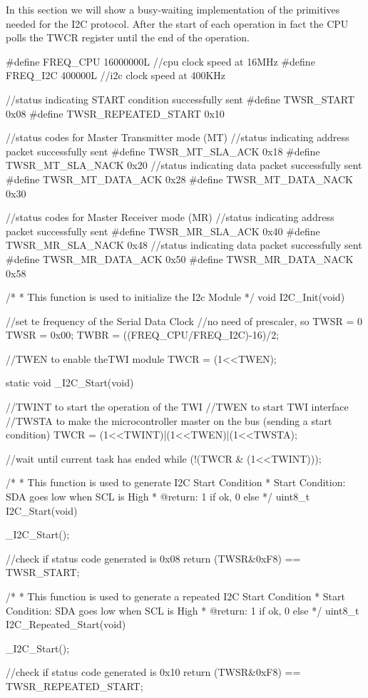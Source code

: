 In this section we will show a busy-waiting implementation of the primitives needed for the I2C protocol. After the start of each operation in fact the CPU polls the TWCR register until the end of the operation.
\begin{ccode}
	#define FREQ_CPU 16000000L	//cpu clock speed at 16MHz
	#define FREQ_I2C 400000L		//i2c clock speed at 400KHz


	//status indicating START condition successfully sent
	#define TWSR_START 0x08
	#define TWSR_REPEATED_START 0x10

	//status codes for Master Transmitter mode (MT)
	//status indicating address packet successfully sent
	#define TWSR_MT_SLA_ACK 0x18
	#define TWSR_MT_SLA_NACK 0x20
	//status indicating data packet successfully sent
	#define TWSR_MT_DATA_ACK 0x28
	#define TWSR_MT_DATA_NACK 0x30

	//status codes for Master Receiver mode (MR)
	//status indicating address packet successfully sent
	#define TWSR_MR_SLA_ACK 0x40
	#define TWSR_MR_SLA_NACK 0x48
	//status indicating data packet successfully sent
	#define TWSR_MR_DATA_ACK 0x50
	#define TWSR_MR_DATA_NACK 0x58

	/*
	 *	This function is used to initialize the I2c Module
	 */
	void I2C_Init(void) {
		//set te frequency of the Serial Data Clock
			//no need of prescaler, so TWSR = 0
		TWSR = 0x00;
		TWBR = ((FREQ_CPU/FREQ_I2C)-16)/2;
		
		//TWEN to enable theTWI module
		TWCR = (1<<TWEN);
	}

	static void _I2C_Start(void) {
		//TWINT to start the operation of the TWI
		//TWEN to start TWI interface
		//TWSTA to make the microcontroller master on the bus (sending a start condition)
		TWCR = (1<<TWINT)|(1<<TWEN)|(1<<TWSTA);

		//wait until current task has ended
		while (!(TWCR & (1<<TWINT)));
	}

	/*
	 *	This function is used to generate I2C Start Condition
	 *		Start Condition: SDA goes low when SCL is High
	 *	@return: 1 if ok, 0 else
	 */
	uint8_t I2C_Start(void) {
		_I2C_Start();
		
		//check if status code generated is 0x08
		return (TWSR&0xF8) == TWSR_START;
	}

	/*
	 *	This function is used to generate a repeated I2C Start Condition
	 *		Start Condition: SDA goes low when SCL is High
	 *	@return: 1 if ok, 0 else
	 */
	uint8_t I2C_Repeated_Start(void) {
		_I2C_Start();
		
		//check if status code generated is 0x10
		return (TWSR&0xF8) == TWSR_REPEATED_START;
	}


\end{ccode}
